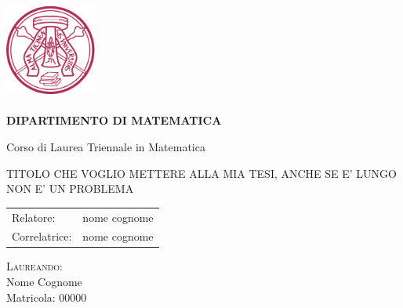 \thispagestyle{empty}
\begin{center}
	\hrulefill \\
\end{center}

\begin{center}
	\includegraphics[width=3cm]{unipv.png}\\
	
	 \\
	{\bf DIPARTIMENTO DI MATEMATICA }\\
	\vspace*{1cm}
	
	
	\vspace{-8pt}
	\normalsize Corso di Laurea Triennale in Matematica
\end{center}
\vspace{2cm}


\begin{center}
	\large 	TITOLO CHE VOGLIO METTERE ALLA MIA TESI, ANCHE SE E' LUNGO NON E' UN PROBLEMA
\end{center}

\vspace*{3cm}

\begin{flushleft}
	\begin{tabular}{ll}
		{\sc Relatore:} & {\sc nome cognome} \vspace{5pt} \\
		{\sc Correlatrice:} & {\sc nome cognome} \\
	\end{tabular}
\end{flushleft}

\vfill

\begin{flushright}
	\textsc{Laureando:} \\
	{\sc Nome Cognome} \\
	Matricola: $00000$
\end{flushright}

